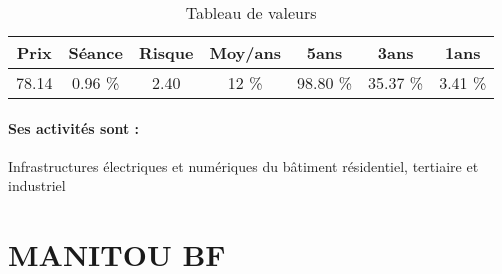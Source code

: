 \documentclass[11pt,a4paper]{report}%
\begin{document}
\begin{table}[H]
  \centering
    \begin{tabular}{|c|c|c|c|c|c|c|}
    \hline
    Prix & Séance & Risque  & Moy/ans & 5ans & 3ans & 1ans \\
    \hline
    78.14 &    0.96 \%    & 2.40 & 12 \% & 98.80 \% & 35.37 \% & 3.41 \% \\
    \hline
    \end{tabular}%
        \label{tab:table_LEGRAND}%
      \caption{Tableau de valeurs}
\end{table}%

\paragraph{Ses activités sont : } Infrastructures électriques et numériques du bâtiment résidentiel, tertiaire et industriel  
    
    \newpage

\section{MANITOU BF}
\end{document}
